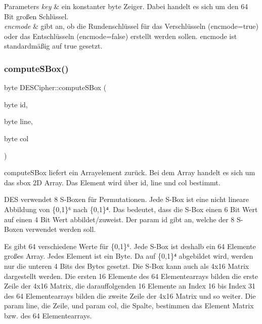 \begin{DoxyParams}{Parameters}
{\em key} & ein konstanter byte Zeiger. Dabei handelt es sich um den 64 Bit großen Schlüssel.\\
\hline
{\em encmode} & gibt an, ob die Rundenschlüssel für das Verschlüsseln (encmode=true) oder das Entschlüsseln (encmode=false) erstellt werden sollen. encmode ist standardmäßig auf true gesetzt. \\
\hline
\end{DoxyParams}
\mbox{\label{classDESCipher_a5d22aac97342f530e88c8e9cf75908c2}} 
\subsubsection{\texorpdfstring{compute\+S\+Box()}{computeSBox()}}
{\footnotesize\ttfamily byte D\+E\+S\+Cipher\+::compute\+S\+Box (\begin{DoxyParamCaption}\item[{byte}]{id,  }\item[{byte}]{line,  }\item[{byte}]{col }\end{DoxyParamCaption})}

compute\+S\+Box liefert ein Arrayelement zurück. Bei dem Array handelt es sich um das sbox 2D Array. Das Element wird über id, line und col bestimmt.

D\+ES verwendet 8 S-\/\+Boxen für Permutationen. Jede S-\/\+Box ist eine nicht lineare Abbildung von \{0,1\}⁶ nach \{0,1\}⁴. Das bedeutet, dass die S-\/\+Box einen 6 Bit Wert auf einen 4 Bit Wert abbildet/zuweist. Der param id gibt an, welche der 8 S-\/\+Boxen verwendet werden soll.

Es gibt 64 verschiedene Werte für \{0,1\}⁶. Jede S-\/\+Box ist deshalb ein 64 Elemente großes Array. Jedes Element ist ein Byte. Da auf \{0,1\}⁴ abgebildet wird, werden nur die unteren 4 Bits des Bytes gesetzt. Die S-\/\+Box kann auch als 4x16 Matrix dargestellt werden. Die ersten 16 Elemente des 64 Elementearrays bilden die erste Zeile der 4x16 Matrix, die darauffolgenden 16 Elemente an Index 16 bis Index 31 des 64 Elementearrays bilden die zweite Zeile der 4x16 Matrix und so weiter. Die param line, die Zeile, und param col, die Spalte, bestimmen das Element Matrix bzw. des 64 Elementearrays.


